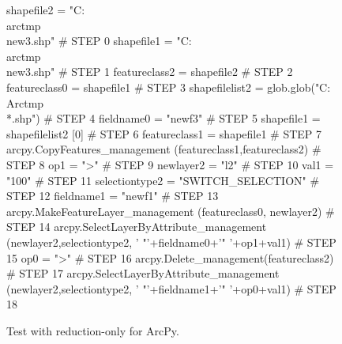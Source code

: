 \begin{figure}[t]
{\scriptsize 
\begin{code}
shapefile2 = "C:\\arctmp\\new3.shp"                \# STEP 0 
shapefile1 = "C:\\arctmp\\new3.shp"                \# STEP 1
featureclass2 = shapefile2                       \# STEP 2
featureclass0 = shapefile1                       \# STEP 3
shapefilelist2 = 
   glob.glob("C:\\Arctmp\\*.shp")                  \# STEP 4
fieldname0 = "newf3"                             \# STEP 5
shapefile1 = shapefilelist2 [0]                  \# STEP 6
featureclass1 = shapefile1                       \# STEP 7
arcpy.CopyFeatures\_management
   (featureclass1,featureclass2)                 \# STEP 8
op1 = ">"                                        \# STEP 9
newlayer2 = "l2"                                 \# STEP 10
val1 = "100"                                     \# STEP 11
selectiontype2 = "SWITCH\_SELECTION"              \# STEP 12
fieldname1 = "newf1"                             \# STEP 13
arcpy.MakeFeatureLayer\_management
   (featureclass0, newlayer2)                    \# STEP 14
arcpy.SelectLayerByAttribute\_management
   (newlayer2,selectiontype2,
   ' "'+fieldname0+'" '+op1+val1)                \# STEP 15
op0 = ">"                                        \# STEP 16
arcpy.Delete\_management(featureclass2)           \# STEP 17
arcpy.SelectLayerByAttribute\_management
   (newlayer2,selectiontype2,
   ' "'+fieldname1+'" '+op0+val1)                \# STEP 18
\end{code}
}
\caption{Test with reduction-only for ArcPy.}
\label{esriorig}
\end{figure}


